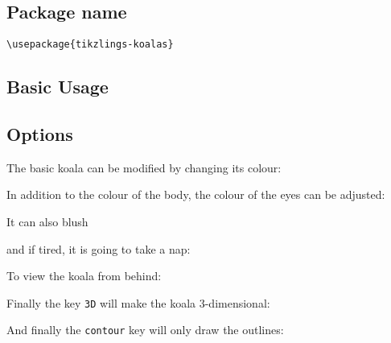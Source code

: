 \documentclass[parskip=half]{scrartcl}
\begin{document}
\subsection{Package name}

\begin{tcolorbox}[lower separated=false, lefthand width=.8\linewidth]
\vspace*{0.5cm}
\lstinline|\usepackage{tikzlings-koalas}| 
\vspace*{0.5cm}
\end{tcolorbox}

\subsection{Basic Usage}

\begin{tcblisting}{}
\koala
\end{tcblisting}

\subsection{Options}

The basic koala can be modified by changing its colour:
\begin{tcblisting}{}
\koala[body=blue]
\end{tcblisting}

In addition to the colour of the body, the colour of the eyes can be adjusted:
\begin{tcblisting}{}
\koala[eye=red]
\end{tcblisting}

It can also blush
\begin{tcblisting}{}
\koala[blush]
\end{tcblisting}

and if tired, it is going to take a nap:
\begin{tcblisting}{}
\koala[sleeping]
\end{tcblisting}

To view the koala from behind:
\begin{tcblisting}{}
\koala[back]
\end{tcblisting}

Finally the key \lstinline|3D| will make the koala 3-dimensional:
\begin{tcblisting}{}
\koala[3D]
\end{tcblisting}

And finally the \lstinline|contour| key will only draw the outlines:
\begin{tcblisting}{}
\koala[contour=black]
\end{tcblisting}
\end{document}
